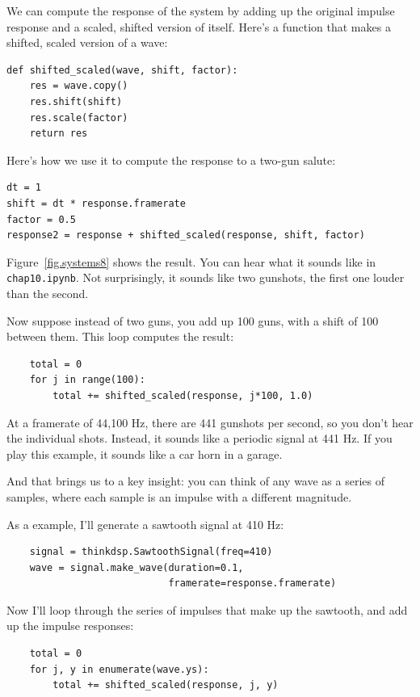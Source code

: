 \documentclass[12pt]{book}
\begin{document}
We can compute the response of the system by adding up
the original impulse response and a scaled, shifted version of itself.
Here's a function that makes a shifted, scaled version of
a wave:

\begin{verbatim}
def shifted_scaled(wave, shift, factor):
    res = wave.copy()
    res.shift(shift)
    res.scale(factor)
    return res
\end{verbatim}

Here's how we use it to compute the response to a two-gun salute:

\begin{verbatim}
dt = 1
shift = dt * response.framerate
factor = 0.5
response2 = response + shifted_scaled(response, shift, factor)
\end{verbatim}

Figure~\ref{fig.systems8} shows the result.  You can hear what
it sounds like in {\tt chap10.ipynb}.  Not surprisingly, it
sounds like two gunshots, the first one louder than the second.

Now suppose instead of two guns, you add up 100 guns, with
a shift of 100 between them.  This loop computes the result:

\begin{verbatim}
    total = 0
    for j in range(100):
        total += shifted_scaled(response, j*100, 1.0)
\end{verbatim}

At a framerate of 44,100 Hz, there are 441 gunshots per second,
so you don't hear the individual shots.  Instead, it sounds
like a periodic signal at 441 Hz.  If you play this example, it
sounds like a car horn in a garage.

And that brings us to a key insight: you can think of any wave as a
series of samples, where each sample is an impulse with a different
magnitude.

As a example, I'll generate a sawtooth signal at 410 Hz:

\begin{verbatim}
    signal = thinkdsp.SawtoothSignal(freq=410)
    wave = signal.make_wave(duration=0.1,
                            framerate=response.framerate)
\end{verbatim}

Now I'll loop through the series of impulses that make up the
sawtooth, and add up the impulse responses:

\begin{verbatim}
    total = 0
    for j, y in enumerate(wave.ys):
        total += shifted_scaled(response, j, y)
\end{verbatim}
\end{document}
